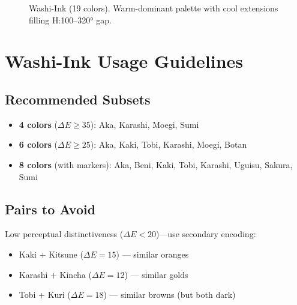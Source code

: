 \begin{figure}[htbp]
    \caption{Washi-Ink (19 colors). Warm-dominant palette with cool extensions filling H:100--320° gap.}
    \label{fig:washi_swatches}
\end{figure}

\section{Washi-Ink Usage Guidelines}

\subsection*{Recommended Subsets}

\begin{itemize}
    \item \textbf{4 colors} ($\Delta E \geq 35$): Aka, Karashi, Moegi, Sumi
    \item \textbf{6 colors} ($\Delta E \geq 25$): Aka, Kaki, Tobi, Karashi, Moegi, Botan
    \item \textbf{8 colors} (with markers): Aka, Beni, Kaki, Tobi, Karashi, Uguisu, Sakura, Sumi
\end{itemize}

\subsection*{Pairs to Avoid}

Low perceptual distinctiveness ($\Delta E < 20$)---use secondary encoding:

\begin{itemize}
    \item Kaki + Kitsune ($\Delta E = 15$) --- similar oranges
    \item Karashi + Kincha ($\Delta E = 12$) --- similar golds
    \item Tobi + Kuri ($\Delta E = 18$) --- similar browns (but both dark)
\end{itemize}

